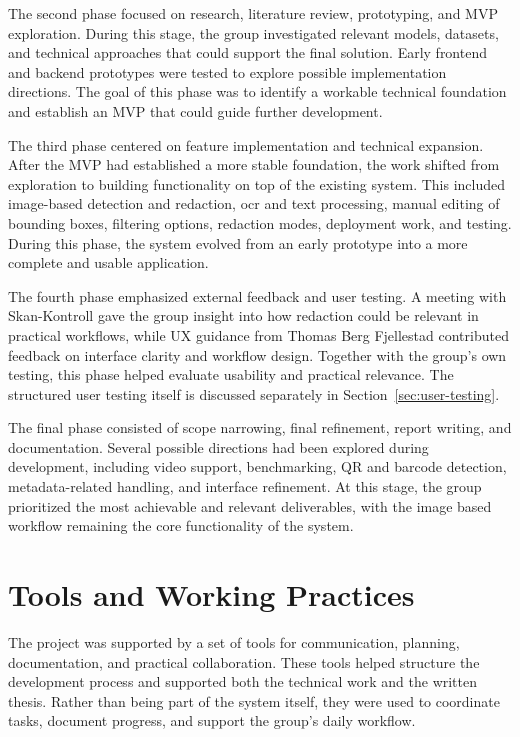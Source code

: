 The second phase focused on research, literature review, prototyping, and MVP exploration. During this stage, the group investigated relevant models, datasets, and technical approaches that could support the final solution. Early frontend and backend prototypes were tested to explore possible implementation directions. The goal of this phase was to identify a workable technical foundation and establish an MVP that could guide further development.

The third phase centered on feature implementation and technical expansion. After the MVP had established a more stable foundation, the work shifted from exploration to building functionality on top of the existing system. This included image-based detection and redaction, \acrshort{ocr} and text processing, manual editing of \gls{bounding box}es, filtering options, redaction modes, deployment work, and testing. During this phase, the system evolved from an early prototype into a more complete and usable application.

The fourth phase emphasized external feedback and user testing. A meeting with Skan-Kontroll gave the group insight into how redaction could be relevant in practical workflows, while UX guidance from Thomas Berg Fjellestad contributed feedback on interface clarity and workflow design. Together with the group’s own testing, this phase helped evaluate usability and practical relevance. The structured user testing itself is discussed separately in Section~\ref{sec:user-testing}.

The final phase consisted of scope narrowing, final refinement, report writing, and documentation. Several possible directions had been explored during development, including video support, benchmarking, QR and barcode detection, metadata-related handling, and interface refinement. At this stage, the group prioritized the most achievable and relevant deliverables, with the image based workflow remaining the core functionality of the system.

\section{Tools and Working Practices}
\label{sec:tools-and-working-practices}

The project was supported by a set of tools for communication, planning, documentation, and practical collaboration. These tools helped structure the development process and supported both the technical work and the written thesis. Rather than being part of the system itself, they were used to coordinate tasks, document progress, and support the group’s daily workflow.

